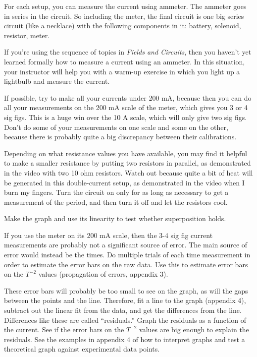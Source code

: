 For each setup, you can measure the current using ammeter. The ammeter goes in series in the circuit. So including
the meter, the final circuit is one big series circuit (like a necklace) with the following components in it:
battery, solenoid, resistor, meter.

If you're using the sequence of topics in \emph{Fields and Circuits}, then you haven't yet learned formally how
to measure a current using an ammeter. In this situation, your instructor will help you with a warm-up exercise
in which you light up a lightbulb and measure the current.

If possible, try to make all your currents under 200 mA, because then you can do all your measurements on the 200 mA
scale of the meter, which gives you 3 or 4 sig figs. This is a huge win over the 10 A scale, which will only give two
sig figs. Don't do some of your measurements on one scale and some on the other, because there is probably quite a big
discrepancy between their calibrations.

Depending on what resistance values you have available, you may find it helpful to make a smaller resistance
by putting two resistors in parallel, as demonstrated in the video with two 10 ohm resistors.
Watch out because
quite a bit of heat will be generated in this double-current setup, as demonstrated in the video when I
burn my fingers. Turn the circuit on only for as long as necessary to get a measurement of the period,
and then turn it off and let the resistors cool.

\analysis


Make the graph and use its linearity to test whether superposition holds.

If you use the meter on its 200 mA scale, then  the 3-4 sig fig current measurements are
probably not a significant source of error. The main source of error would instead be the times.
Do multiple trials of each time measurement in order to estimate the error bars on the raw data.
Use this to estimate error bars on the $T^{-2}$ values (propagation of errors, appendix 3).

These error bars will probably be too small to see on the graph, as will the gaps between the points
and the line. Therefore, fit a line to the
graph (appendix 4), subtract out the linear fit from the data, and get the differences from the
line. Differences like these are called ``residuals.'' Graph the residuals as a function of the
current. See if the error bars on the $T^{-2}$	values
are big enough to explain the residuals. See the examples in appendix 4 of how to interpret graphs
and test a theoretical graph against experimental data points.

